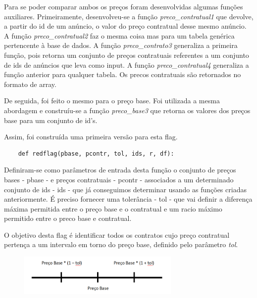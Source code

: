 Para se poder comparar ambos os preços foram desenvolvidas algumas funções auxiliares.
Primeiramente, desenvolveu-se a função \textit{preco\_contratual1} que devolve, a partir do id de um anúncio, o valor do preço contratual desse mesmo anúncio.
A função \textit{preco\_contratual2} faz o mesma coisa mas para um tabela genérica pertencente à base de dados. A função \textit{preco\_contrato3} generaliza a primeira função, pois retorna um conjunto de preços contratuais referentes a um conjunto de ids de anúncios que leva como input. A função \textit{preco\_contratual4} generaliza a função anterior para qualquer tabela. Os precos contratuais são retornados no formato de array.


De seguida, foi feito o mesmo para o preço base. Foi utilizada a mesma abordagem e construíu-se a função \textit{preco\_base3} que retorna os valores dos preços base para um conjunto de id's. 


Assim, foi construída uma primeira versão para esta flag. 

\begin{verbatim}
	def redflag(pbase, pcontr, tol, ids, r, df):
\end{verbatim}

Definiram-se como parâmetros de entrada desta função o conjunto de preços bases - pbase - e preços contratuais - pcontr - associados a um determinado conjunto de ids - ids - que já conseguimos determinar usando as funções criadas anteriormente. É preciso fornecer uma tolerância - tol - que vai definir a diferença máxima permitida entre o preço base e o contratual e um racio máximo permitido entre o preco base e contratual. 


O objetivo desta flag é identificar todos os contratos cujo preço contratual pertença a um intervalo em torno do preço base, definido pelo parâmetro \textit{tol}.

\begin{figure}[H]
	\centering
	\includegraphics[width=0.7\textwidth]{imagens/pbasecontr.png}
	\caption{}
	\label{}
\end{figure}



